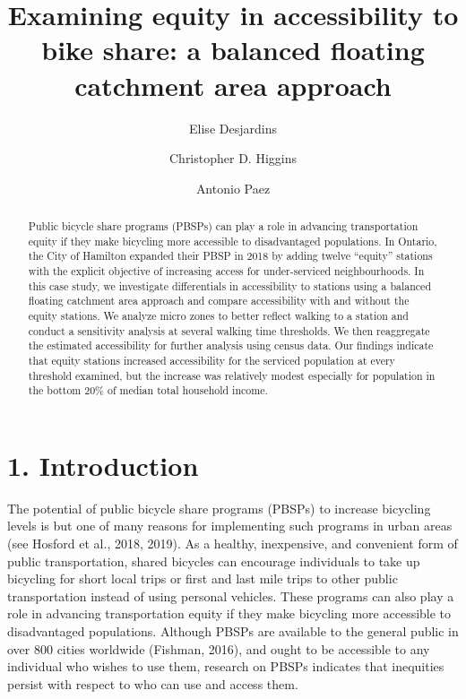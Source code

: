 \documentclass[]{elsarticle} %
\begin{document}
\begin{frontmatter}

  \title{Examining equity in accessibility to bike share: a balanced floating
catchment area approach}
    \author[McMaster University]{Elise Desjardins}
    \author[University of Toronto Scarborough]{Christopher D. Higgins}
    \author[McMaster University]{Antonio Paez}
      \address[McMaster University]{School of Earth, Environment \& Society, McMaster University, 1280 Main
Street West, Hamilton, ON L8S4L8}
    \address[University of Toronto Scarborough]{Department of Geography \& Planning, University of Toronto Scarborough,
1265 Military Trail, Toronto, ON M1C1A4}
  
  \begin{abstract}
  Public bicycle share programs (PBSPs) can play a role in advancing
  transportation equity if they make bicycling more accessible to
  disadvantaged populations. In Ontario, the City of Hamilton expanded
  their PBSP in 2018 by adding twelve ``equity'' stations with the
  explicit objective of increasing access for under-serviced
  neighbourhoods. In this case study, we investigate differentials in
  accessibility to stations using a balanced floating catchment area
  approach and compare accessibility with and without the equity stations.
  We analyze micro zones to better reflect walking to a station and
  conduct a sensitivity analysis at several walking time thresholds. We
  then reaggregate the estimated accessibility for further analysis using
  census data. Our findings indicate that equity stations increased
  accessibility for the serviced population at every threshold examined,
  but the increase was relatively modest especially for population in the
  bottom 20\% of median total household income.
  \end{abstract}
  
 \end{frontmatter}

\newpage

\hypertarget{introduction}{%
\section{1. Introduction}\label{introduction}}

The potential of public bicycle share programs (PBSPs) to increase
bicycling levels is but one of many reasons for implementing such
programs in urban areas (see Hosford et al., 2018, 2019). As a healthy,
inexpensive, and convenient form of public transportation, shared
bicycles can encourage individuals to take up bicycling for short local
trips or first and last mile trips to other public transportation
instead of using personal vehicles. These programs can also play a role
in advancing transportation equity if they make bicycling more
accessible to disadvantaged populations. Although PBSPs are available to
the general public in over 800 cities worldwide (Fishman, 2016), and
ought to be accessible to any individual who wishes to use them,
research on PBSPs indicates that inequities persist with respect to who
can use and access them.
\end{document}
